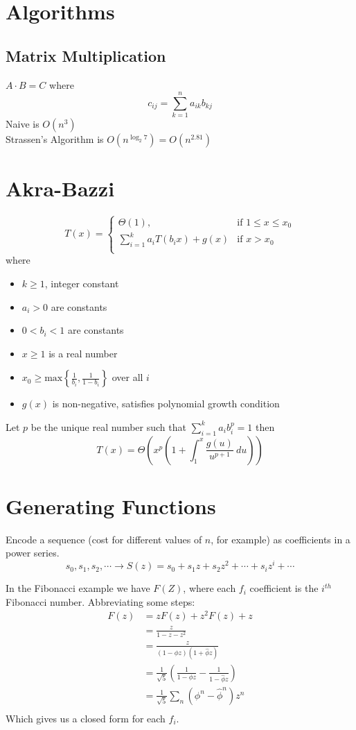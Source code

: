 \documentclass[10pt]{article}
\begin{document}
\section{Algorithms}

\subsection{Matrix Multiplication}

$A \cdot B = C$ where
$$c_{ij} = \sum_{k = 1}^n a_{ik} b_{kj}$$
Naive is $O(n^3)$ \\
Strassen's Algorithm is $O\left(n^{\log_2 7}\right) = O\left( n^{2.81}\right)$

\section{Akra-Bazzi}

$$
T(x) = \left\{ \begin{array}{ll}
      \Theta(1), & \text{if } 1 \leq x \leq x_0 \\
      \sum_{i = 1}^k a_i T(b_i x) + g(x) & \text{if } x > x_0\\
\end{array}\right.
$$
where
\begin{itemize}
  \item $k \geq 1$, integer constant
  \item $a_i > 0$ are constants
  \item $0 < b_i < 1$ are constants
  \item $x \geq 1$ is a real number
  \item $x_0 \geq \text{max}\left\{\frac{1}{b_i}, \frac{1}{1 - b_i} \right\}$ over all $i$
  \item $g(x)$ is non-negative, satisfies polynomial growth condition
\end{itemize}
Let $p$ be the unique real number such that $\sum_{i = 1}^k a_i b_i^p = 1$
then
$$
T(x) = \Theta\left(
x^p \left(
  1 + \int_{1}^x \frac{g(u)}{u^{p + 1}} \ du
\right)
\right)
$$

\section{Generating Functions}
Encode a sequence (cost for different values of $n$, for example) as coefficients in a power series.
$$
s_0, s_1, s_2, \cdots \rightarrow S(z) = s_0 + s_1 z + s_2 z^2 + \cdots + s_i z^i + \cdots
$$

In the Fibonacci example we have $F(Z)$, where each $f_i$ coefficient is the $i^{th}$ Fibonacci number.
Abbreviating some steps:
\begin{align*}
  F(z) &= zF(z) + z^2 F(z) + z \\
  &= \frac{z}{1 - z - z^2} \\
  &= \frac{z}{(1 - \phi z) (1 + \hat{\phi} z)} \\
  &= \frac{1}{\sqrt{5}}\left( \frac{1}{1 - \phi z} - \frac{1}{1 - \hat{\phi}z}\right) \\
  &= \frac{1}{\sqrt{5}} \sum_{n} (\phi^n - \hat{\phi}^n)z^n \\
\end{align*}
Which gives us a closed form for each $f_i$.
\end{document}
